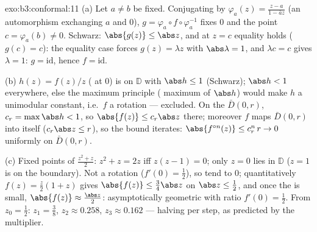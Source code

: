 \begin{solution}{exo:b3:conformal:11}
(a) Let $a \neq b$ be fixed. Conjugating by $\varphi_a(z) =
\frac{z - a}{1 - \bar az}$ (an automorphism exchanging $a$
and $0$), $g = \varphi_a\circ f\circ\varphi_a^{-1}$ fixes
$0$ and the point $c = \varphi_a(b) \neq 0$. Schwarz:
$\abs{g(z)} \leq \abs z$, and at $z = c$ equality holds
($g(c) = c$): the equality case forces $g(z) = \lambda z$
with $\abs\lambda = 1$, and $\lambda c = c$ gives $\lambda =
1$: $g = \mathrm{id}$, hence $f = \mathrm{id}$.

(b) $h(z) = f(z)/z$ ( at $0$) is
 on $\mathbb D$ with $\abs h \leq 1$ (Schwarz);
$\abs h < 1$ everywhere, else the maximum principle
( maximum of $\abs h$) would make $h$ a unimodular
constant, i.e.\ $f$ a rotation --- excluded. On the 
$\bar D(0,r)$, $c_r = \max\abs h < 1$, so $\abs{f(z)} \leq
c_r\abs z$ there; moreover $f$ maps $\bar D(0,r)$ into
itself ($c_r\abs z \leq r$), so the bound iterates:
$\abs{f^{\circ n}(z)} \leq c_r^n\,r \to 0$ uniformly on
$\bar D(0, r)$.

(c) Fixed points of $\frac{z^2 + z}2$: $z^2 + z = 2z$ iff
$z(z - 1) = 0$; only $z = 0$ lies in $\mathbb D$ ($z = 1$ is
on the boundary). Not a rotation ($f'(0) = \frac12$), so
 tend to $0$; quantitatively $f(z) = \frac z2(1 + z)$
gives $\abs{f(z)} \leq \frac{3}{4}\abs z$ on $\abs z \leq
\frac12$, and once the  is small, $\abs{f(z)} \approx
\frac{\abs z}2$: asymptotically geometric with ratio
$f'(0) = \frac12$. From $z_0 = \frac12$: $z_1 = \frac38$,
$z_2 \approx 0.258$, $z_3 \approx 0.162$ --- halving per
step, as predicted by the multiplier.
\end{solution}

